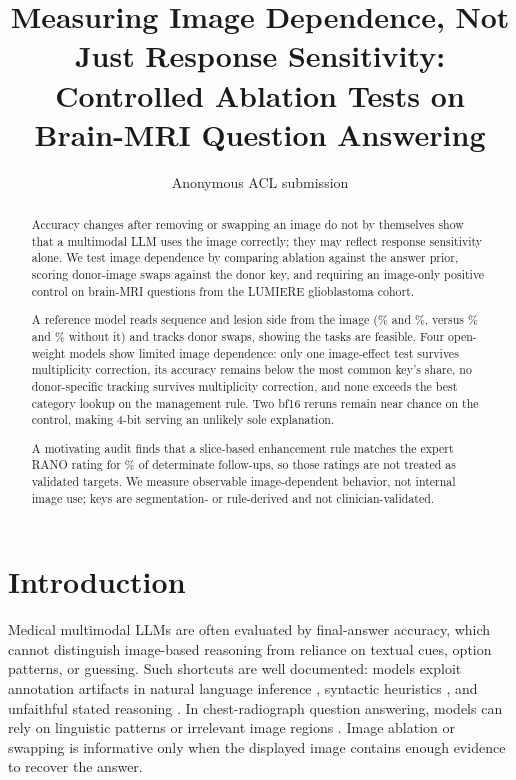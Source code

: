 \documentclass[11pt]{article}
\title{Measuring Image Dependence, Not Just Response Sensitivity: Controlled Ablation Tests on Brain-MRI Question Answering}
\author{Anonymous ACL submission}
\begin{document}
\maketitle

\begin{abstract}
Accuracy changes after removing or swapping an image do not by themselves show that a multimodal LLM uses the image correctly; they may reflect response sensitivity alone. We test image dependence by comparing ablation against the answer prior, scoring donor-image swaps against the donor key, and requiring an image-only positive control on brain-MRI questions from the LUMIERE glioblastoma cohort.

A reference model reads sequence and lesion side from the image (\vfourEoneOwnAIAGemini{}\% and \vfourEoneOwnLILGemini{}\%, versus \vfourEoneTextAIAGemini{}\% and \vfourEoneTextLILGemini{}\% without it) and tracks donor swaps, showing the tasks are feasible. Four open-weight models show limited image dependence: only one image-effect test survives multiplicity correction, its accuracy remains below the most common key's share, no donor-specific tracking survives multiplicity correction, and none exceeds the best category lookup on the management rule. Two bf16 reruns remain near chance on the control, making 4-bit serving an unlikely sole explanation.

A motivating audit finds that a slice-based enhancement rule matches the expert RANO rating for \vfourConcordantDetPct{}\% of \vfourDeterminate{} determinate follow-ups, so those ratings are not treated as validated targets. We measure observable image-dependent behavior, not internal image use; keys are segmentation- or rule-derived and not clinician-validated.
\end{abstract}

\section{Introduction}
\label{sec:introduction}

Medical multimodal LLMs are often evaluated by final-answer accuracy, which cannot distinguish image-based reasoning from reliance on textual cues, option patterns, or guessing. Such shortcuts are well documented: models exploit annotation artifacts in natural language inference \citep{gururangan2018annotation}, syntactic heuristics \citep{mccoy2019right}, and unfaithful stated reasoning \citep{turpin2023language}. In chest-radiograph question answering, models can rely on linguistic patterns or irrelevant image regions \citep{nguyen2025localizing}. Image ablation or swapping is informative only when the displayed image contains enough evidence to recover the answer.
\end{document}
